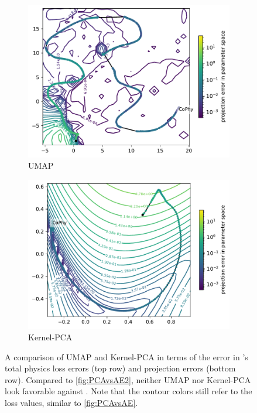 \documentclass[letterpaper]{article} %
\begin{document}
\begin{figure}
              \begin{subfigure}[b]{0.3\textwidth}
                \includegraphics[width=\textwidth]{figures/round3/UMAP/map_phy_total_dists_param_space.pdf}
                \caption{UMAP}
              \end{subfigure}
              \begin{subfigure}[b]{0.3\textwidth}
                \includegraphics[width=\textwidth]{figures/round3/Kernel-PCA/map_phy_total_dists_param_space.pdf}
                \caption{Kernel-PCA}
                \label{fig:subfig2}
              \end{subfigure}

              \caption{A comparison of UMAP and Kernel-PCA in terms of the error in \cophy{}'s total physics loss errors (top row) and projection errors (bottom row). Compared to \cref{fig:PCAvsAE2}, neither UMAP nor Kernel-PCA look favorable against \proposedautencoder{}. Note that the contour colors still refer to the loss values, similar to \cref{fig:PCAvsAE}. %
              }
              \label{fig:UMAPKernelPCA_app}
            \end{figure}
\end{document}
